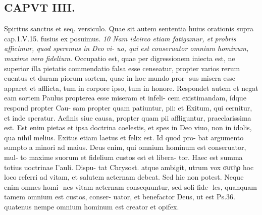 \documentclass{article}
\begin{document}
\begin{pages}
\section*{CAPVT  IIII. }
\marginpar{[ p.228 ]}Spiritus sanctus et seq. versiculo. Quae sit autem sententia huius orationis supra cap.1.V.15. fusius ex posuimus. \textit{10 Nam idcirco etiam fatigamur, et} \textit{probris afficimur, quod speremus in Deo vi-} \textit{uo, qui est conseruator omnium hominum,} \textit{maxime vero fidelium.} Occupatio est, quae per digressionem iniecta est, ne superior illa pietatis commendatio falsa esse censeatur, propter varios rerum euentus et duram piorum sortem, quae in hoc mundo pror- sus misera esse apparet et afflicta, tum in corpore ipso, tum in honore. Respondet autem et negat eam sortem Paulus propterea esse miseram et infeli- cem existimandam, ídque respond propter Cau- sam propter quam patiuntur, pii: et Exitum, qui cernitur, et inde speratur. Acfinis siue causa, propter quam pii affliguntur, praeclarissima est. Est enim pietas et ipsa doctrina coelestis, et spes in Deo viuo, non in idolis, qua nihil melius. Exitus etiam laetus et felix est. Id quod pro- bat argumento sumpto a minori ad maius. Deus enim, qui omnium hominum est conseruator, mul- to maxime suorum et fidelium custos est et libera- tor. Haec est summa totius uoctrinae I'auli. Dispu- tat Chrysost. atque ambigit, utrum vox συτὴρ hoc loco referri ad vitam, et salutem aeternam debeat. Sed hic non potest. Neque enim omnes homi- nes vitam aeternam consequuntur, sed soli fide- les, quanquam tamem omnium est custos, conser- uator, et benefactor Deus, ut est Ps.36. quatenus nempe omnium hominum est creator et opifex. 

\end{pages}
\end{document}
